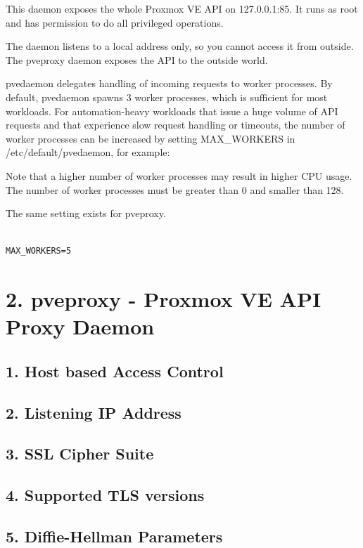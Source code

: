 This daemon exposes the whole Proxmox VE API on 127.0.0.1:85. It runs as root and has permission to do all privileged operations.

The daemon listens to a local address only, so you cannot access it from outside. The pveproxy daemon exposes the API to the outside world.

pvedaemon delegates handling of incoming requests to worker processes. By default, pvedaemon spawns 3 worker processes, which is sufficient for most workloads. For automation-heavy workloads that issue a huge volume of API requests and that experience slow request handling or timeouts, the number of worker processes can be increased by setting MAX_WORKERS in /etc/default/pvedaemon, for example:

Note that a higher number of worker processes may result in higher CPU usage. The number of worker processes must be greater than 0 and smaller than 128.

The same setting exists for pveproxy.

\begin{lstlisting}

MAX_WORKERS=5

\end{lstlisting}


\section{2. pveproxy - Proxmox VE API Proxy Daemon}

\subsection{1. Host based Access Control}

\subsection{2. Listening IP Address}

\subsection{3. SSL Cipher Suite}

\subsection{4. Supported TLS versions}

\subsection{5. Diffie-Hellman Parameters}

